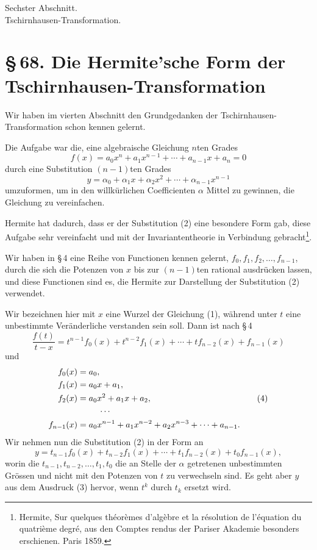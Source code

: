 \documentclass[11pt]{article}
\providecommand{\sect}[2]{\section*{\S\,#1. #2}}
\begin{document}
\begin{center}
{\large Sechster Abschnitt.}\\[0.45em]
{\Large Tschirnhausen-Transformation.}
\end{center}

\sect{68}{Die Hermite'sche Form der Tschirnhausen-Transformation}

Wir haben im vierten Abschnitt den Grundgedanken der Tschirnhausen-Transformation schon kennen gelernt.

Die Aufgabe war die, eine algebraische Gleichung $n$ten Grades
\begin{equation}
 f(x)=a_0x^n+a_1x^{n-1}+\cdots+a_{n-1}x+a_n=0
\tag{1}
\end{equation}
durch eine Substitution $(n-1)$ten Grades
\begin{equation}
 y=\alpha_0+\alpha_1x+\alpha_2x^2+\cdots+\alpha_{n-1}x^{n-1}
\tag{2}
\end{equation}
umzuformen, um in den willkürlichen Coefficienten $\alpha$ Mittel zu gewinnen, die Gleichung zu vereinfachen.

Hermite hat dadurch, dass er der Substitution (2) eine besondere Form gab, diese Aufgabe sehr vereinfacht und mit der Invariantentheorie in Verbindung gebracht\footnote{Hermite, Sur quelques théorèmes d'algèbre et la résolution de l'équation du quatrième degré, aus den Comptes rendus der Pariser Akademie besonders erschienen. Paris 1859.}.

Wir haben in \S\,4 eine Reihe von Functionen kennen gelernt, $f_0,f_1,f_2,\ldots,f_{n-1}$, durch die sich die Potenzen von $x$ bis zur $(n-1)$ten rational ausdrücken lassen, und diese Functionen sind es, die Hermite zur Darstellung der Substitution (2) verwendet.

Wir bezeichnen hier mit $x$ eine Wurzel der Gleichung (1), während unter $t$ eine unbestimmte Veränderliche verstanden sein soll. Dann ist nach \S\,4
\begin{equation}
 \frac{f(t)}{t-x}=t^{n-1}f_0(x)+t^{n-2}f_1(x)+\cdots+t f_{n-2}(x)+f_{n-1}(x)
\tag{3}
\end{equation}
und
\begin{equation}
\begin{aligned}
 f_0(x)&=a_0,\\
 f_1(x)&=a_0x+a_1,\\
 f_2(x)&=a_0x^2+a_1x+a_2,\\
 &\hspace{2.5em}\cdots\\
 f_{n-1}(x)&=a_0x^{n-1}+a_1x^{n-2}+a_2x^{n-3}+\cdots+a_{n-1}.
\end{aligned}
\tag{4}
\end{equation}
Wir nehmen nun die Substitution (2) in der Form an
\begin{equation}
 y=t_{n-1}f_0(x)+t_{n-2}f_1(x)+\cdots+t_1f_{n-2}(x)+t_0f_{n-1}(x),
\tag{5}
\end{equation}
worin die $t_{n-1},t_{n-2},\ldots,t_1,t_0$ die an Stelle der $\alpha$ getretenen unbestimmten Grössen und nicht mit den Potenzen von $t$ zu verwechseln sind. Es geht aber $y$ aus dem Ausdruck (3) hervor, wenn $t^k$ durch $t_k$ ersetzt wird.
\end{document}

